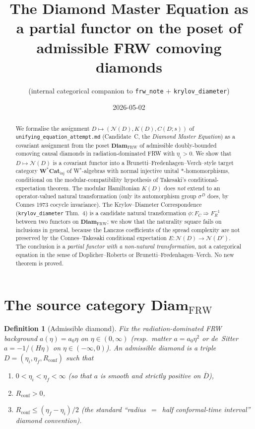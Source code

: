 \documentclass[11pt]{article}
\title{The Diamond Master Equation as a partial functor on the poset of admissible FRW comoving diamonds}
\author{(internal categorical companion to \texttt{frw\_note} + \texttt{krylov\_diameter})}
\date{2026-05-02}
\newtheorem{definition}[theorem]{Definition}
\newcommand{\NN}{\mathcal{N}}
\newcommand{\FRW}{{\mathrm{FRW}}}
\newcommand{\Diam}{\mathbf{Diam}_\FRW}
\newcommand{\WCatinj}{\mathbf{W^{*}\!Cat}_{\mathrm{inj}}}
\begin{document}
\maketitle

\begin{abstract}
We formalise the assignment $D\mapsto(\NN(D),K(D),C(D;s))$ of
\texttt{unifying\_equation\_attempt.md} (Candidate~C, the
\emph{Diamond Master Equation}) as a covariant assignment from the
poset $\Diam$ of admissible doubly-bounded comoving causal diamonds
in radiation-dominated FRW with $\eta_i>0$. We show that
$D\mapsto\NN(D)$ is a covariant functor into a Brunetti--Fredenhagen--Verch--style
target category $\WCatinj$ of W$^*$-algebras with normal injective
unital $*$-homomorphisms, conditional on the modular-compatibility
hypothesis of Takesaki's conditional-expectation theorem. The
modular Hamiltonian $K(D)$ does \emph{not} extend to an
operator-valued natural transformation (only its automorphism group
$\sigma^D$ does, by Connes 1973 cocycle invariance). The
Krylov--Diameter Correspondence (\texttt{krylov\_diameter} Thm.~4)
is a candidate natural transformation
$\phi:F_C\Rightarrow F_R^{-1}$ between two functors on $\Diam$;
we show that the naturality square fails on inclusions in general,
because the Lanczos coefficients of the spread complexity are not
preserved by the Connes--Takesaki conditional expectation
$E:\NN(D)\to\NN(D')$. The conclusion is a \emph{partial functor with
a non-natural transformation}, not a categorical equation in the
sense of Doplicher--Roberts or Brunetti--Fredenhagen--Verch. No new
theorem is proved.
\end{abstract}

\section{The source category $\Diam$}\label{sec:source}

\begin{definition}[Admissible diamond]\label{def:admissible}
Fix the radiation-dominated FRW background $a(\eta)=a_0\eta$ on
$\eta\in(0,\infty)$ (resp.\ matter $a=a_0\eta^2$ or de~Sitter
$a=-1/(H\eta)$ on $\eta\in(-\infty,0)$). An \emph{admissible
diamond} is a triple $D=(\eta_i,\eta_f,R_{\mathrm{conf}})$ such that
\begin{enumerate}
\item $0<\eta_i<\eta_f<\infty$ (so that $a$ is smooth and strictly
positive on $\overline{D}$),
\item $R_{\mathrm{conf}}>0$,
\item $R_{\mathrm{conf}}\le(\eta_f-\eta_i)/2$ (the standard
``radius~$=$~half conformal-time interval'' diamond convention).
\end{enumerate}
\end{definition}
\end{document}
